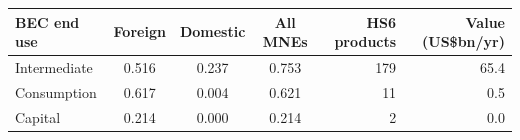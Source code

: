 \begin{tabular}{lcccrr}
\toprule
BEC end use & Foreign & Domestic & All MNEs & HS6 products & Value (US\$bn/yr) \\
\midrule
Intermediate & 0.516 & 0.237 & 0.753 & 179 & 65.4 \\
Consumption & 0.617 & 0.004 & 0.621 & 11 & 0.5 \\
Capital & 0.214 & 0.000 & 0.214 & 2 & 0.0 \\
\bottomrule
\end{tabular}
